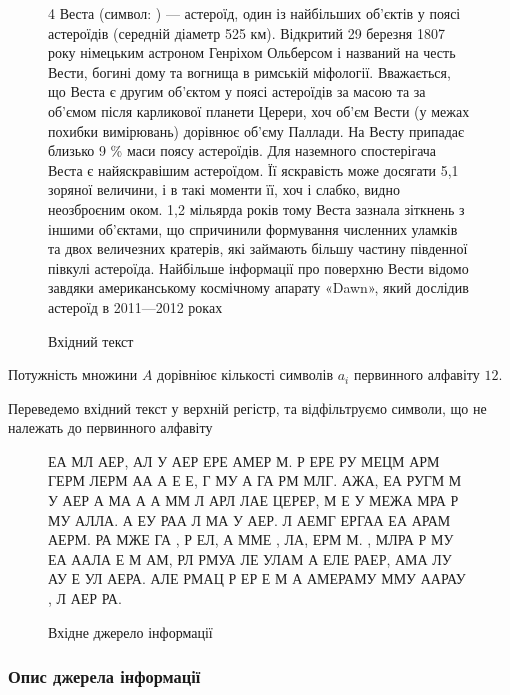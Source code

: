 \documentclass[a4paper,14pt]{extreport}
\begin{document}
 \begin{figure}[h]
	\centering
	\begin{minipage}{0.8\textwidth}  %
	4 Веста (символ: \Vesta) — астероїд, один із найбільших об'єктів у поясі астероїдів (середній діаметр 525 км). Відкритий 29 березня 1807 року німецьким астроном Генріхом Ольберсом і названий на честь Вести, богині дому та вогнища в римській міфології. Вважається, що Веста є другим об'єктом у поясі астероїдів за масою та за об'ємом після карликової планети Церери, хоч об'єм Вести (у межах похибки вимірювань) дорівнює об'єму Паллади. На Весту припадає близько 9 \% маси поясу астероїдів. Для наземного спостерігача Веста є найяскравішим астероїдом. Її яскравість може досягати 5,1 зоряної величини, і в такі моменти її, хоч і слабко, видно неозброєним оком. 1,2 мільярда років тому Веста зазнала зіткнень з іншими об'єктами, що спричинили формування численних уламків та двох величезних кратерів, які займають більшу частину південної півкулі астероїда. Найбільше інформації про поверхню Вести відомо завдяки американському космічному апарату «Dawn», який дослідив астероїд в 2011—2012 роках
	\end{minipage}
	\caption*{Вхідний текст}
	\label{fig:sample-text}
\end{figure}


Потужність множини $A$ дорівніює кількості символів $a_i$ первинного алфавіту $12$. 

Переведемо вхідний текст у  верхній регістр, та відфільтруємо символи, що не належать до первинного алфавіту


 \begin{figure}[h]
	\centering
	\begin{minipage}{0.8\textwidth}  %
	ЕА МЛ   АЕР,   АЛ  У  АЕР ЕРЕ АМЕР  М. Р  ЕРЕ  РУ МЕЦМ АРМ ГЕРМ ЛЕРМ  АА А Е Е, Г МУ А ГА  РМ МЛГ. АЖА,  ЕА  РУГМ М У  АЕР А МА А А ММ Л АРЛ ЛАЕ ЦЕРЕР,  М Е У МЕЖА  МРА Р МУ АЛЛА. А ЕУ РАА Л   МА У АЕР. Л АЕМГ ЕРГАА ЕА  АРАМ АЕРМ.  РА МЖЕ ГА , Р ЕЛ,   А ММЕ ,   ЛА,  ЕРМ М. , МЛРА Р МУ ЕА ААЛА Е  М АМ,  РЛ РМУА ЛЕ УЛАМ А  ЕЛЕ РАЕР,  АМА ЛУ АУ Е УЛ АЕРА. АЛЕ РМАЦ Р ЕР Е М А АМЕРАМУ ММУ ААРАУ ,  Л АЕР   РА.
	\end{minipage}
	
	\caption*{Вхідне джерело інформації} %
	\label{fig:filtered-text}
\end{figure}



 
 \subsubsection{Опис джерела інформації}
 
\end{document}
